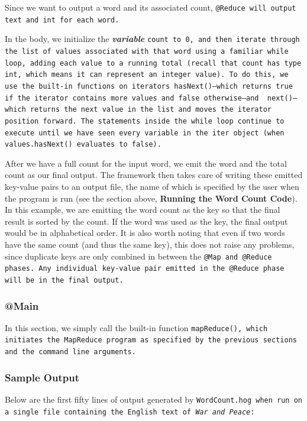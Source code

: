 \documentclass{report}
\begin{document}
Since we want to output a word and its associated count, \tt @Reduce \rm will
output \tt text \rm and \tt int \rm for each word.

In the body, we initialize the \textbf{\emph{variable}} \tt count \rm to \tt 0\rm,
and then iterate through the list of values associated with that word using a familiar \tt while \rm loop,
adding each value to a running total (recall that \tt count \rm has
type \tt int\rm, which means it can represent an integer value). To do this, we use
the built-in functions on iterators \tt hasNext()\rm---which returns \tt true \rm
if the iterator contains more values and \tt false \rm otherwise---and \tt
next()\rm---which returns the next value in the \tt list \rm and moves the
iterator position forward. The statements inside the \tt while \rm loop continue to
execute until we have seen every variable in the \tt iter \rm object (when \tt
values.hasNext() \rm evaluates to \tt false\rm).

After we have a full count for the input word, we emit the word and the total count
as our final output. The framework then takes care of writing these emitted
key-value pairs to an output file, the name of which is specified by the user when
the program is run (see the section above, \textbf{Running the Word Count Code}). In this example, we are emitting the word count as the key so that the final result is sorted by the count. If the word was used as the key, the final output would be in alphabetical order. It is also worth noting that even if two words have the same count (and thus the same key), this does not raise any problems, since duplicate keys are only combined in between the \tt @Map \rm and \tt @Reduce \rm phases. Any individual key-value pair emitted in the \tt @Reduce \rm phase will be in the final output.

\subsubsection{@Main}

In this section, we simply call the built-in function \tt mapReduce()\rm, which
initiates the MapReduce program as specified by the previous sections and the
command line arguments.

\subsubsection{Sample Output}

Below are the first fifty lines of output generated by \tt WordCount.hog \rm when run
on a single file containing the English text of \emph{War and Peace}:
\end{document}

